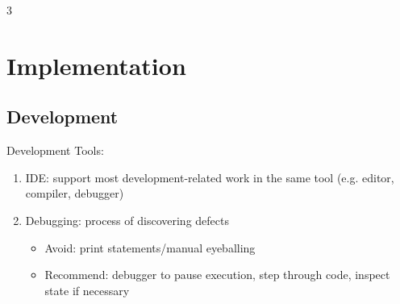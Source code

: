 \documentclass[12pt, a4paper]{article}
\begin{document}
\begin{multicols*}{3}
\section{Implementation}
\subsection{Development}

Development Tools:
\begin{enumerate}[\roman*.]
  \item IDE: support most development-related work in the same tool (e.g. editor, compiler, debugger) 
  \item Debugging: process of discovering defects
    \begin{itemize}[leftmargin=*]\vspace{3pt}
      \item Avoid: print statements/manual eyeballing
      \item Recommend: debugger to pause execution, step through code, inspect state if necessary
    \end{itemize}
\end{enumerate}
\vspace{-.25em}

\end{multicols*}
\end{document}
